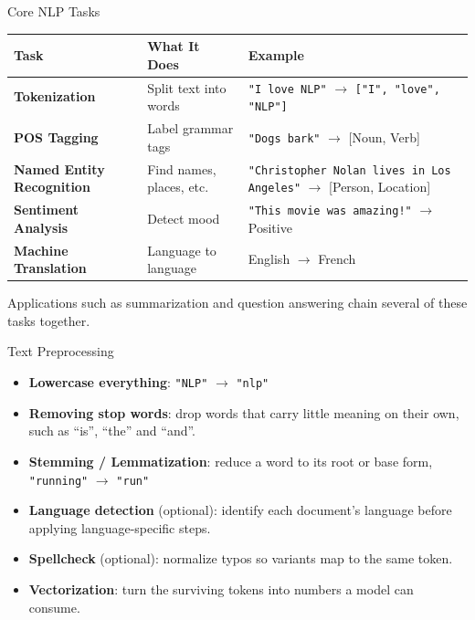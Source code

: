 \begin{frame}[allowframebreaks]{Core NLP Tasks}
\begin{table}[ht]
    \centering
    \renewcommand{\arraystretch}{1.5} %
    \begin{tabular}{@{} >{\raggedright\arraybackslash}p{}
                        >{\raggedright\arraybackslash}p{}
                        >{\raggedright\arraybackslash}p{} @{}}
        \toprule
        \textbf{Task} & \textbf{What It Does} & \textbf{Example} \\
        \midrule
        \textbf{Tokenization} & Split text into words & \texttt{"I love NLP"} $\rightarrow$ \texttt{["I", "love", "NLP"]} \\
        \textbf{POS Tagging} & Label grammar tags & \texttt{"Dogs bark"} $\rightarrow$ [Noun, Verb] \\
        \textbf{Named Entity Recognition} & Find names, places, etc. & \texttt{"Christopher Nolan lives in Los Angeles"} $\rightarrow$ [Person, Location] \\
        \textbf{Sentiment Analysis} & Detect mood & \texttt{"This movie was amazing!"} $\rightarrow$ Positive \\
        \textbf{Machine Translation} & Language to language & English $\rightarrow$ French \\
        \bottomrule
    \end{tabular}
\end{table}
\vspace{0.3em}
{\small Applications such as summarization and question answering chain several of these
tasks together.}
\end{frame}


\begin{frame}{Text Preprocessing}
    \begin{itemize}
        \setlength{\itemsep}{0.7em}
        \item \textbf{Lowercase everything}: \texttt{"NLP"} $\rightarrow$ \texttt{"nlp"}
        \item \textbf{Removing stop words}: drop words that carry little meaning on their
        own, such as ``is'', ``the'' and ``and''.
        \item \textbf{Stemming / Lemmatization}: reduce a word to its root or base form,
        \texttt{"running"} $\rightarrow$ \texttt{"run"}
        \item \textbf{Language detection} (optional): identify each document's language
        before applying language-specific steps.
        \item \textbf{Spellcheck} (optional): normalize typos so variants map to the same
        token.
        \item \textbf{Vectorization}: turn the surviving tokens into numbers a model can
        consume.
    \end{itemize}
\end{frame}

